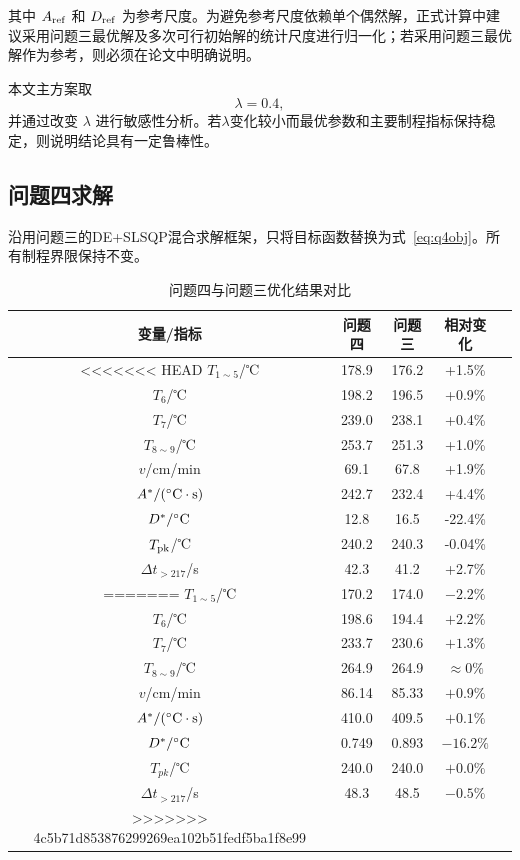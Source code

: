 \documentclass{cumcmthesis}
\begin{document}
其中 $A_{\rm ref}$ 和 $D_{\rm ref}$ 为参考尺度。为避免参考尺度依赖单个偶然解，正式计算中建议采用问题三最优解及多次可行初始解的统计尺度进行归一化；若采用问题三最优解作为参考，则必须在论文中明确说明。

本文主方案取
\[
\lambda=0.4,
\]
并通过改变 $\lambda$ 进行敏感性分析。若$\lambda$变化较小而最优参数和主要制程指标保持稳定，则说明结论具有一定鲁棒性。

\subsection{问题四求解}

沿用问题三的DE+SLSQP混合求解框架，只将目标函数替换为式~\eqref{eq:q4obj}。所有制程界限保持不变。

\begin{table}[H]
\centering
\caption{问题四与问题三优化结果对比}
\label{tab:q4result}
\begin{tabular}{ccccc}
\toprule
变量/指标 & 问题四 & 问题三 & 相对变化 \\
\midrule
<<<<<<< HEAD
$T_{1\sim5}$/℃ & 178.9 & 176.2 & +1.5\% \\
$T_6$/℃ & 198.2 & 196.5 & +0.9\% \\
$T_7$/℃ & 239.0 & 238.1 & +0.4\% \\
$T_{8\sim9}$/℃ & 253.7 & 251.3 & +1.0\% \\
$v$/cm/min & 69.1 & 67.8 & +1.9\% \\
\midrule
$A^*/({}^\circ{\rm C}\cdot{\rm s})$ & 242.7 & 232.4 & +4.4\% \\
$D^*/{}^\circ{\rm C}$ & 12.8 & 16.5 & -22.4\% \\
$T_{\rm pk}$/℃ & 240.2 & 240.3 & -0.04\% \\
$\Delta t_{>217}$/s & 42.3 & 41.2 & +2.7\% \\
=======
$T_{1\sim5}$/℃ & 170.2 & 174.0 & $-2.2\%$\\
$T_6$/℃ & 198.6 & 194.4 & $+2.2\%$\\
$T_7$/℃ & 233.7 & 230.6 & $+1.3\%$\\
$T_{8\sim9}$/℃ & 264.9 & 264.9 & $\approx0\%$\\
$v$/cm/min & 86.14 & 85.33 & $+0.9\%$\\
\midrule
$A^*/({}^\circ{\rm C}\cdot{\rm s})$ & 410.0 & 409.5 & $+0.1\%$\\
$D^*/{}^\circ{\rm C}$ & 0.749 & 0.893 & $-16.2\%$\\
$T_{pk}$/℃ & 240.0 & 240.0 & $+0.0\%$\\
$\Delta t_{>217}$/s & 48.3 & 48.5 & $-0.5\%$\\
>>>>>>> 4c5b71d853876299269ea102b51fedf5ba1f8e99
\bottomrule
\end{tabular}
\end{table}
\end{document}
